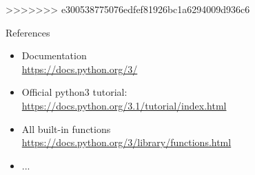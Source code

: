 \documentclass[10pt]{beamer}
\begin{document}
>>>>>>> e300538775076edfef81926bc1a6294009d936c6

\begin{frame}[fragile]{References}

    \begin{itemize}
        \item Documentation\\
            \url{https://docs.python.org/3/}
        \item \pause Official python3 tutorial:\\
            \url{https://docs.python.org/3.1/tutorial/index.html}
        \item \pause All built-in functions\\
        	\url{https://docs.python.org/3/library/functions.html}
        \item \pause ...

    \end{itemize}

\end{frame}
\end{document}

